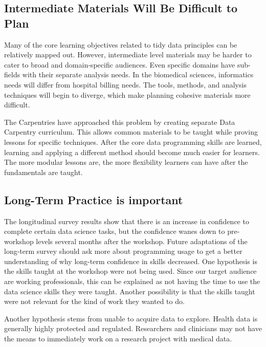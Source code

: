 \documentclass[030-workshop.tex]{subfiles}
\begin{document}
    \subsection{Intermediate Materials Will Be Difficult to Plan}

        Many of the core learning objectives related to tidy data principles can be relatively mapped out.
        However, intermediate level materials may be harder to cater to broad and domain-specific audiences.
        Even specific domains have sub-fields with their separate analysis needs.
        In the biomedical sciences, informatics needs will differ from hospital billing needs.
        The tools, methods, and analysis techniques will begin to diverge, which make planning
        cohesive materials more difficult.

        The Carpentries have approached this problem by creating separate Data Carpentry curriculum.
        This allows common materials to be taught while proving lessons for specific techniques.
        After the core data programming skills are learned,
        learning and applying a different method should become much easier for learners.
        The more modular lessons are, the more flexibility learners can have after the fundamentals are taught.

    \subsection{Long-Term Practice is important}

        The longitudinal survey results show that there is an increase in confidence to complete certain data science tasks,
        but the confidence wanes down to pre-workshop levels several months after the workshop.
        Future adaptations of the long-term survey should ask more about programming usage to get a better understanding
        of why long-term confidence in skills decreased.
        One hypothesis is the skills taught at the workshop were not being used.
        Since our target audience are working professionals,
        this can be explained as not having the time to use the data science skills they were taught.
        Another possibility is that the skills taught were not relevant for the kind of work they wanted to do.

        Another hypothesis stems from unable to acquire data to explore.
        Health data is generally highly protected and regulated.
        Researchers and clinicians may not have the means to immediately work on a research project with medical data.
\end{document}
